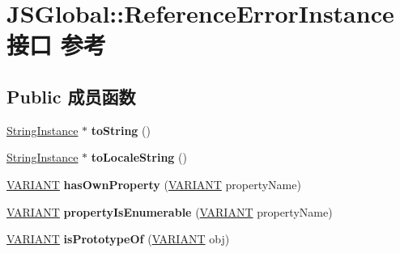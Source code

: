 \hypertarget{interface_j_s_global_1_1_reference_error_instance}{}\section{J\+S\+Global\+:\+:Reference\+Error\+Instance接口 参考}
\label{interface_j_s_global_1_1_reference_error_instance}
\subsection*{Public 成员函数}
\begin{DoxyCompactItemize}
\item 
\mbox{\label{interface_j_s_global_1_1_reference_error_instance_a23b2f14535412db763ae49f32389bf75}} 
\hyperlink{interface_j_s_global_1_1_string_instance}{String\+Instance} $\ast$ {\bfseries to\+String} ()
\item 
\mbox{\label{interface_j_s_global_1_1_reference_error_instance_a51591500820dd1684d5ee7e70999679d}} 
\hyperlink{interface_j_s_global_1_1_string_instance}{String\+Instance} $\ast$ {\bfseries to\+Locale\+String} ()
\item 
\mbox{\label{interface_j_s_global_1_1_reference_error_instance_a64e1737eeac09fc310dd73232d0cbeaa}} 
\hyperlink{structtag_v_a_r_i_a_n_t}{V\+A\+R\+I\+A\+NT} {\bfseries has\+Own\+Property} (\hyperlink{structtag_v_a_r_i_a_n_t}{V\+A\+R\+I\+A\+NT} property\+Name)
\item 
\mbox{\label{interface_j_s_global_1_1_reference_error_instance_abc31ba1372d92f4bb37ffa65ec30baf5}} 
\hyperlink{structtag_v_a_r_i_a_n_t}{V\+A\+R\+I\+A\+NT} {\bfseries property\+Is\+Enumerable} (\hyperlink{structtag_v_a_r_i_a_n_t}{V\+A\+R\+I\+A\+NT} property\+Name)
\item 
\mbox{\label{interface_j_s_global_1_1_reference_error_instance_a7a855b56760651d488b7153a11b8a3d0}} 
\hyperlink{structtag_v_a_r_i_a_n_t}{V\+A\+R\+I\+A\+NT} {\bfseries is\+Prototype\+Of} (\hyperlink{structtag_v_a_r_i_a_n_t}{V\+A\+R\+I\+A\+NT} obj)
\end{DoxyCompactItemize}
